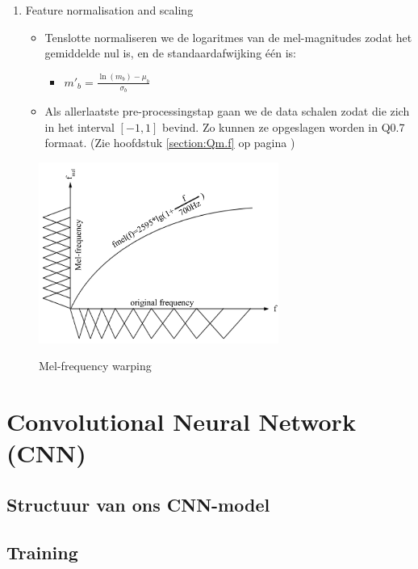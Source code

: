 \begin{no-awa}
\begin{enumerate}
	\item Feature normalisation and scaling
	      \begin{itemize}
		      \item Tenslotte normaliseren we de logaritmes van de mel-magnitudes zodat het gemiddelde nul is, en de standaardafwijking één is:
		            \begin{itemize}[label={}]
			            \item \(m'_b = \frac{\ln\left( m_b \right) - \mu_b}{\sigma_b}\)
		            \end{itemize}
		      \item Als allerlaatste pre-processingstap gaan we de data schalen zodat die zich in het interval \(\left[ -1,1 \right]\) bevind. Zo kunnen ze opgeslagen worden in Q0.7 formaat. (Zie hoofdstuk \ref{section:Qm.f} op pagina \pageref{section:Qm.f})
	      \end{itemize}
\end{enumerate}
\end{no-awa}


\begin{figure}[ht]
	\centering
	\includegraphics[width=0.7\textwidth]{figuren/mel-frequency.png}
	\caption{Mel-frequency warping}
	\cite{efficient-feature-extraction}
	\label{fig:mel-bands}
\end{figure}


\section{Convolutional Neural Network (CNN)}

\subsection{Structuur van ons CNN-model}

\subsection{Training}
